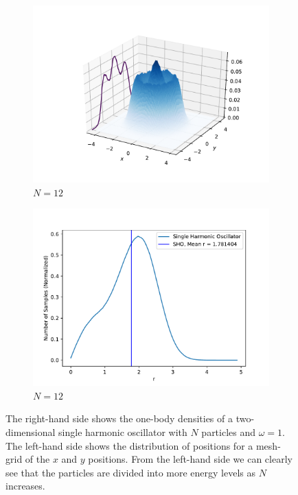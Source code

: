 \documentclass[../main.tex]{subfiles}
\begin{document}
\begin{figure}
\medskip
\begin{subfigure}{0.48\textwidth}
\includegraphics[width=\linewidth]{figures/densitySHO/density3D_SHO_N12_Omega1_2d}
\caption{$N=12$} \label{fig:SHO_density3D_N12_e}
\end{subfigure}\hspace*{\fill}
\begin{subfigure}{0.48\textwidth}
\includegraphics[width=\linewidth]{figures/densitySHO/density_SHO_N12_Omega1_2d}
\caption{$N=12$} \label{fig:SHO_density_N12_f}
\end{subfigure}

\caption{The right-hand side shows the one-body densities of a two-dimensional single harmonic oscillator with $N$ particles and $\omega=1$. The left-hand side shows the distribution of positions for a mesh-grid of the $x$ and $y$ positions. From the left-hand side we can clearly see that the particles are divided into more energy levels as $N$ increases.} \label{fig:SHO_density3D_2d}
\end{figure}
\end{document}
